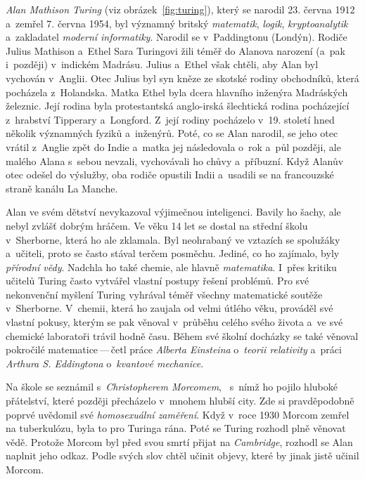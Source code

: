 \documentclass[a4paper, 11pt]{article}
\begin{document}
\emph{Alan Mathison Turing} (viz
obrázek~\ref{fig:turing}), který se narodil 23. června 1912 a~zemřel 7.
června 1954, byl významný britský \emph{matematik}, \emph{logik},
\emph{kryptoanalytik} a~zakladatel \emph{moderní informatiky}. Narodil se
v~Paddingtonu (Londýn). Rodiče Julius Mathison a~Ethel Sara Turingovi žili
téměř do Alanova narození (a~pak i~později) v~indickém Madrásu. Julius
a~Ethel však chtěli, aby Alan byl vychován v~Anglii. Otec Julius byl syn
kněze  ze skotské rodiny obchodníků, která pocházela z~Holandska. Matka
Ethel byla dcera hlavního inženýra Madráských železnic. Její rodina byla
protestantská anglo-irská šlechtická rodina pocházející z~hrabství Tipperary
a~Longford. Z~její rodiny pocházelo v~19. století hned několik významných
fyziků a~inženýrů. Poté, co se Alan narodil, se jeho otec vrátil z~Anglie
zpět do Indie a~matka jej následovala o~rok a~půl později, ale malého
Alana s~sebou nevzali, vychovávali ho chůvy a~příbuzní. Když Alanův otec
odešel do výslužby, oba rodiče opustili Indii a~usadili se na francouzské
straně kanálu La Manche.

Alan ve svém dětství nevykazoval výjimečnou inteligenci. Bavily ho šachy,
ale nebyl zvlášť dobrým hráčem. Ve věku 14 let se dostal na střední školu
v~Sherborne, která ho ale zklamala. Byl neohrabaný ve vztazích se spolužáky
a~učiteli, proto se často stával terčem posměchu. Jediné, co ho zajímalo,
byly \emph{přírodní vědy}. Nadchla ho také chemie, ale hlavně
\emph{matematika}. I~přes kritiku učitelů Turing často vytvářel vlastní
postupy řešení problémů. Pro své nekonvenční myšlení Turing vyhrával téměř
všechny matematické soutěže v~Sherborne. V~chemii, která ho zaujala od
velmi útlého věku, prováděl své vlastní pokusy, kterým se pak věnoval v~průběhu
celého svého života a~ve své chemické laboratoři trávil hodně času. Během
své školní docházky se také věnoval pokročilé matematice\,---\,četl práce
\emph{Alberta Einsteina} o~\emph{teorii relativity} a~práci \emph{Arthura S.
Eddingtona} o~\emph{kvantové mechanice}.

Na škole se seznámil s~\emph{Christopherem Morcomem}, ~s~nímž ho pojilo
hluboké přátelství, které později přecházelo v~mnohem hlubší city. Zde si
pravděpodobně poprvé uvědomil své \emph{homosexuální zaměření}. Když v~roce
1930 Morcom zemřel na tuberkulózu, byla to pro Turinga rána. Poté
se Turing rozhodl plně věnovat vědě. Protože Morcom byl před svou smrtí
přijat na \emph{Cambridge}, rozhodl se Alan naplnit jeho odkaz. Podle svých
slov chtěl učinit objevy, které by jinak jistě učinil Morcom.
\end{document}
